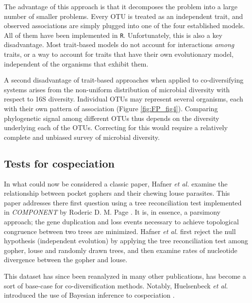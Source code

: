 The advantage of this approach is that it decomposes the problem into a large number of smaller problems. Every OTU is treated as an independent trait, and observed associations are simply plugged into one of the four established models. All of them have been implemented in {\tt R}. Unfortunately, this is also a key disadvantage. Most trait-based models do not account for interactions {\em among} traits, or a way to account for traits that have their own evolutionary model, independent of the organisms that exhibit them. 

A second disadvantage of trait-based approaches when applied to co-diversifying systems arises from the non-uniform distribution of microbial diversity with respect to 16S diversity. Individual OTUs may represent several organisms, each with their own pattern of association (Figure \ref{fig:FP_fig4}). Comparing phylogenetic signal among different OTUs thus depends on the diversity underlying each of the OTUs. Correcting for this would require a relatively complete and unbiased survey of microbial diversity.



\subsection{Tests for cospeciation}

In what could now be considered a classic paper, Hafner {\em et al.} \cite{hafner1994disparate} examine the relationship between pocket gophers and their chewing louse parasites. This paper addresses there first question using a tree reconciliation test implemented in {\em COMPONENT} by Roderic D. M. Page \cite{page1993genes}. It is, in essence, a parsimony approach; the gene duplication and loss events necessary to achieve topological congruence between two trees are minimized. Hafner {\em et al.} first reject the null hypothesis (independent evolution) by applying the tree reconciliation test among gopher, louse and randomly drawn trees, and then examine rates of nucleotide divergence between the gopher and louse. 

This dataset has since been reanalyzed in many other publications, has become a sort of base-case for co-diversification methods. Notably, Huelsenbeck {\em et al.} introduced the use of Bayesian inference to cospeciation \cite{huelsenbeck2000bayesian}.


